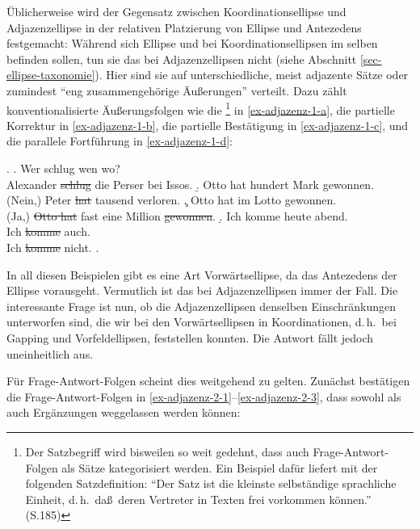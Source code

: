 Üblicherweise wird der Gegensatz zwischen Koordinationsellipse und Adjazenzellipse in der relativen Platzierung von Ellipse und Antezedens festgemacht: Während sich Ellipse und  bei Koordinationsellipsen im selben  befinden sollen, tun sie das bei Adjazenzellipsen nicht (siehe Abschnitt \ref{sec-ellipse-taxonomie}). Hier sind sie auf unterschiedliche, meist adjazente Sätze oder zumindest "`eng zusammengehörige Äu\ss erungen"' \cite[768]{Klein:93} verteilt. Dazu zählt \cite{Klein:93} konventionalisierte Äu\ss erungsfolgen wie die \footnote{Der Satzbegriff wird bisweilen so weit gedehnt, dass auch Frage-Antwort-Folgen als Sätze kategorisiert werden. Ein Beispiel dafür liefert \cite{Kindt:85} mit der folgenden Satzdefinition: "`Der Satz ist die kleinste selbständige sprachliche Einheit, d.\,h.\ da\ss \ deren Vertreter in Texten frei vorkommen können."' (S.185)} in \ref{ex-adjazenz-1-a}, die partielle Korrektur in \ref{ex-adjazenz-1-b}, die partielle Bestätigung in \ref{ex-adjazenz-1-c}, und die parallele Fortführung in \ref{ex-adjazenz-1-d}:  

\ex. \label{ex-adjazenz-1}
\a. \label{ex-adjazenz-1-a} Wer schlug wen wo? \\
Alexander \sout{schlug} die Perser bei Issos.
\b. \label{ex-adjazenz-1-b} Otto hat hundert Mark gewonnen.\\
(Nein,) Peter \sout{hat} tausend verloren.
\c. \label{ex-adjazenz-1-c} Otto hat im Lotto gewonnen. \\
(Ja,) \sout{Otto hat} fast eine Million \sout{gewonnen}.
\d. \label{ex-adjazenz-1-d} Ich komme heute abend. \\
Ich \sout{komme} auch. \\
Ich \sout{komme} nicht.
\z. \cite[768]{Klein:93} 

In all diesen Beispielen gibt es eine Art Vorwärtsellipse, da das Antezedens der Ellipse vorausgeht. Vermutlich ist das bei Adjazenzellipsen immer der Fall. Die interessante Frage ist nun, ob die Adjazenzellipsen denselben Einschränkungen unterworfen sind, die wir bei den Vorwärtsellipsen in Koordinationen, d.\,h.\ bei Gapping und Vorfeldellipsen, feststellen konnten. Die Antwort fällt jedoch uneinheitlich aus. 

Für Frage-Antwort-Folgen scheint dies weitgehend zu gelten. Zunächst bestätigen die Fra\-ge-Antwort-Folgen in \ref{ex-adjazenz-2-1}--\ref{ex-adjazenz-2-3}, dass sowohl  als auch Ergänzungen weggelassen werden können: 

